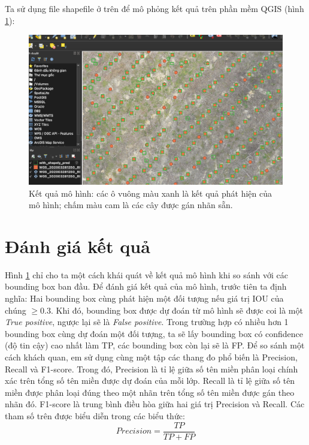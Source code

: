 \documentclass[a4paper, 12pt]{report}
\begin{document}
Ta sử dụng file shapefile ở trên để mô phỏng kết quả trên phần mềm QGIS (hình \ref{fig:demo_result}): 
 \begin{figure}[!h]
	\centering
	\includegraphics[width=1\linewidth]{Images/demo_result}
	\caption{Kết quả mô hình: các ô vuông màu xanh là kết quả phát hiện của mô hình; chấm màu cam là các cây được gán nhãn sẵn. }
	\label{fig:demo_result}
\end{figure}


\section{Đánh giá kết quả}
Hình \ref{fig:demo_result} chỉ cho ta một cách khái quát về kết quả mô hình khi so sánh với các bounding box ban đầu.  Để đánh giá kết quả của mô hình,  trước tiên ta định nghĩa: Hai bounding box cùng phát hiện một đối tượng nếu giá trị IOU của chúng $\geq 0.3$. Khi đó,  bounding box được dự đoán từ mô hình sẽ được coi là một \textit{True positive},  ngược lại sẽ là \textit{False positive}.  Trong trường hợp có nhiều hơn 1 bounding box cùng dự đoán một đối tượng,  ta sẽ lấy bounding box có confidence (độ tin cậy) cao nhất làm TP, các bounding box còn lại sẽ là FP.  Để so sánh một cách khách quan, em sử dụng cùng một tập các thang đo phổ biến là Precision, Recall và F1-score.  Trong đó, Precision là tỉ lệ giữa số tên miền phân loại chính xác trên tổng số tên miền được dự đoán của mỗi lớp. Recall là tỉ lệ giữa số tên miền được
phân loại đúng theo một nhãn trên tổng số tên miền được gán theo nhãn đó.
F1-score là trung bình điều hòa giữa hai giá trị Precision và Recall. Các tham
số trên được biểu diễn trong các biểu thức:
\begin{equation*}
	Precision = \frac{TP}{TP + FP}
\end{equation*}
\end{document}

